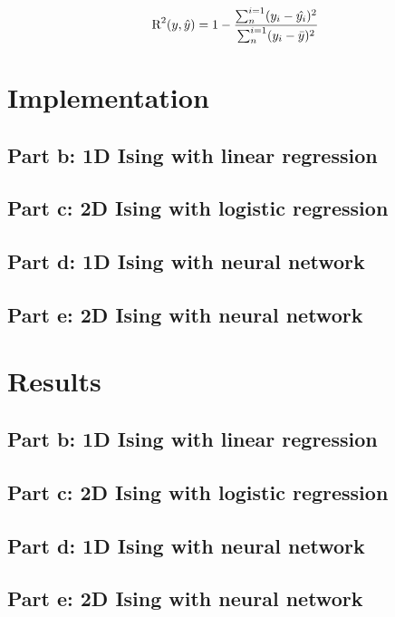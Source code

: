 \documentclass[a4paper,12pt, english]{article}
\begin{document}
\begin{equation}
\textnormal{R}^2(y,\hat{y}) = 1 - \frac{\sum_{n}^{i=1} (y_i - \hat{y_i})^2}{\sum_{n}^{i=1}(y_i - \bar{y})^2}
\end{equation}

\section{Implementation}

\subsection{Part b: 1D Ising with linear regression}

\subsection{Part c: 2D Ising with logistic regression}

\subsection{Part d: 1D Ising with neural network}

\subsection{Part e: 2D Ising with neural network}


\section{Results}

\subsection{Part b: 1D Ising with linear regression}

\subsection{Part c: 2D Ising with logistic regression}

\subsection{Part d: 1D Ising with neural network}

\subsection{Part e: 2D Ising with neural network}
\end{document}
